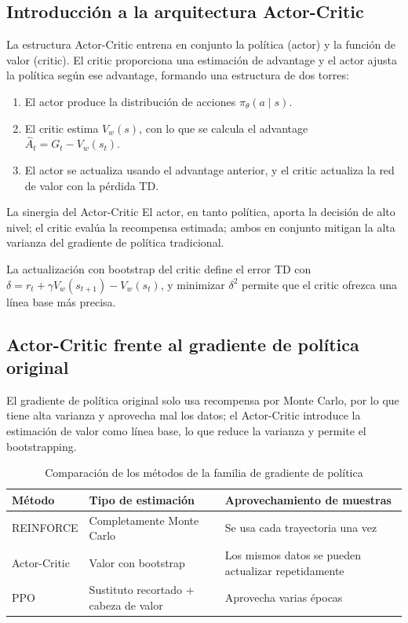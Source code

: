 \documentclass[a4paper]{article}
\begin{document}
\subsection{Introducción a la arquitectura Actor-Critic}
La estructura Actor-Critic entrena en conjunto la política (actor) y la función de valor (critic). El critic proporciona una estimación de advantage y el actor ajusta la política según ese advantage, formando una estructura de dos torres:
\begin{enumerate}
    \item El actor produce la distribución de acciones $\pi_\theta(a\mid s)$.
    \item El critic estima $V_w(s)$, con lo que se calcula el advantage $\hat{A}_t = G_t - V_w(s_t)$.
    \item El actor se actualiza usando el advantage anterior, y el critic actualiza la red de valor con la pérdida TD.
\end{enumerate}
\begin{knowledgebox}{La sinergia del Actor-Critic}
El actor, en tanto política, aporta la decisión de alto nivel; el critic evalúa la recompensa estimada; ambos en conjunto mitigan la alta varianza del gradiente de política tradicional.
\end{knowledgebox}

La actualización con bootstrap del critic define el error TD con $\delta = r_t + \gamma V_w(s_{t+1}) - V_w(s_t)$, y minimizar $\delta^2$ permite que el critic ofrezca una línea base más precisa.

\subsection{Actor-Critic frente al gradiente de política original}
El gradiente de política original solo usa recompensa por Monte Carlo, por lo que tiene alta varianza y aprovecha mal los datos; el Actor-Critic introduce la estimación de valor como línea base, lo que reduce la varianza y permite el bootstrapping.
\begin{table}[H]
\centering
\small
\begin{tabular}{p{}p{}p{}}
\toprule
Método & Tipo de estimación & Aprovechamiento de muestras \\
\midrule
REINFORCE & Completamente Monte Carlo & Se usa cada trayectoria una vez \\
Actor-Critic & Valor con bootstrap & Los mismos datos se pueden actualizar repetidamente \\
PPO & Sustituto recortado + cabeza de valor & Aprovecha varias épocas \\
\bottomrule
\end{tabular}
\caption{Comparación de los métodos de la familia de gradiente de política}
\end{table}
\end{document}
